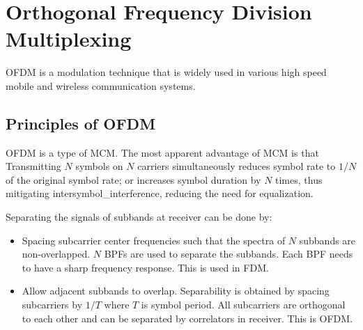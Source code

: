 
\section{Orthogonal Frequency Division Multiplexing}
\gls{OFDM} is a modulation technique that is widely used in various high speed mobile and wireless communication systems. 

\subsection{Principles of OFDM}
OFDM is a type of \gls{MCM}\cite{fuqin}. The most apparent advantage of \gls{MCM} is that Transmitting $N$ symbols on $N$ carriers simultaneously reduces symbol rate to $1/N$ of the original symbol rate; or increases symbol duration by $N$ times, thus mitigating \gls{intersymbol_interference}, reducing the need for \gls{equalization}.

Separating the signals of \gls{subband}s at receiver can be done by:
\begin{itemize}
	\item Spacing subcarrier center frequencies such that the spectra of $N$ \gls{subband}s are non-overlapped. $N$
	\gls{BPF}s are used to separate the \gls{subband}s. Each \gls{BPF} needs to have a sharp frequency response. This is used in \gls{FDM}.
	\item Allow adjacent \gls{subband}s to overlap. Separability is obtained by spacing \gls{subcarrier}s by $1/T$ where $T$ is symbol period. All \gls{subcarrier}s are \gls{orthogonal} to each other and can be separated by correlators in receiver. This is \gls{OFDM}.
\end{itemize}

